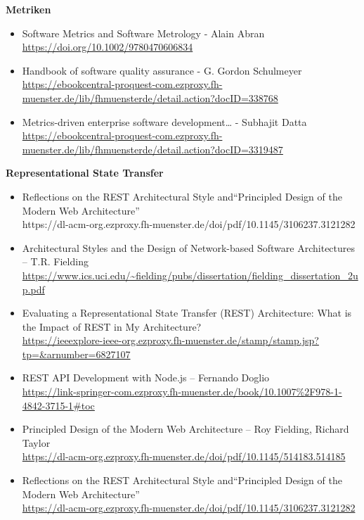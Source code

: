 \documentclass[../../expose]{subfiles}
\begin{document}
\textbf{Metriken}
\begin{itemize}
	\item Software Metrics and Software Metrology - Alain Abran\\ \url{https://doi.org/10.1002/9780470606834}
	\item Handbook of software quality assurance - G. Gordon Schulmeyer \\ \url{https://ebookcentral-proquest-com.ezproxy.fh-muenster.de/lib/fhmuensterde/detail.action?docID=338768}
	\item Metrics-driven enterprise software development… - Subhajit Datta \\ \url{https://ebookcentral-proquest-com.ezproxy.fh-muenster.de/lib/fhmuensterde/detail.action?docID=3319487}
\end{itemize}

\textbf{Representational State Transfer}
\begin{itemize}
	\item Reflections on the REST Architectural Style and“Principled Design of the Modern Web Architecture” \\ https://dl-acm-org.ezproxy.fh-muenster.de/doi/pdf/10.1145/3106237.3121282 
	\item Architectural Styles and the Design of Network-based Software Architectures – T.R. Fielding \\ \url{https://www.ics.uci.edu/~fielding/pubs/dissertation/fielding_dissertation_2up.pdf}
	\item Evaluating a Representational State Transfer (REST) Architecture: What is the Impact of REST in My Architecture? \\ \url{https://ieeexplore-ieee-org.ezproxy.fh-muenster.de/stamp/stamp.jsp?tp=&arnumber=6827107}
	\item REST API Development with Node.js – Fernando Doglio \\ \url{https://link-springer-com.ezproxy.fh-muenster.de/book/10.1007\%2F978-1-4842-3715-1#toc}
	\item Principled Design of the Modern Web Architecture – Roy Fielding, Richard Taylor \\ \url {https://dl-acm-org.ezproxy.fh-muenster.de/doi/pdf/10.1145/514183.514185}
	\item Reflections on the REST Architectural Style and“Principled Design of the Modern Web Architecture” \\ \url{https://dl-acm-org.ezproxy.fh-muenster.de/doi/pdf/10.1145/3106237.3121282} 
\end{itemize}
\end{document}
